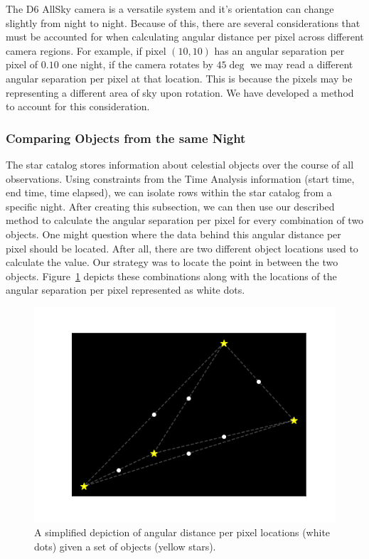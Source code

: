 The D6 AllSky camera is a versatile system and it's orientation can change slightly from night to night.
Because of this, there are several considerations that must be accounted for when calculating angular distance per pixel across different camera regions.
For example, if pixel $(10,10)$ has an angular separation per pixel of $0.10$ one night, if the camera rotates by $45 \deg$ we may read a different angular separation per pixel at that location. 
This is because the pixels may be representing a different area of sky upon rotation.
We have developed a method to account for this consideration.

\subsubsection{Comparing Objects from the same Night}

The star catalog stores information about celestial objects over the course of all observations.
Using constraints from the Time Analysis information (start time, end time, time elapsed), we can isolate rows within the star catalog from a specific night.  
After creating this subsection, we can then use our described method to calculate the angular separation per pixel for every combination of two objects.
One might question where the data behind this angular distance per pixel should be located.
After all, there are two different object locations used to calculate the value.
Our strategy was to locate the point in between the two objects.  
Figure~\ref{starcombos} depicts these combinations along with the locations of the angular separation per pixel represented as white dots.

\begin{figure}[ht!]
  \centering
  \includegraphics[scale=0.70]{images/star_combinations.png}
  \caption{A simplified depiction of angular distance per pixel locations (white dots) given a set of objects (yellow stars).}
  \label{starcombos}
\end{figure}

